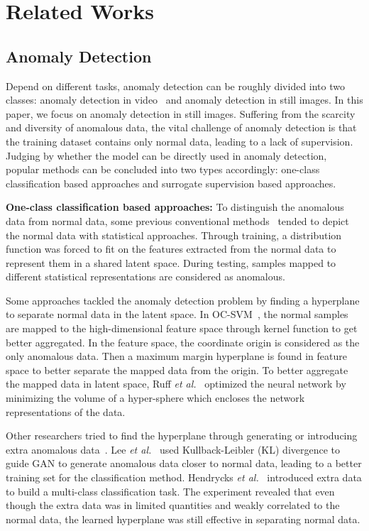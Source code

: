 \documentclass[journal]{IEEEtran}
\begin{document}
\section{Related Works}
\subsection{Anomaly Detection}
Depend on different tasks, anomaly detection can be roughly divided into two classes: anomaly detection in video~\cite{Kiran2018An, chu2018sparse, xu2018anomaly, xu2019video, sabokrou2016video, sabokrou2018avid, sabokrou2020deep, sabokrou2018deep, sabokrou2017deep, Sabokrou2018Adversarially} and anomaly detection in still images.
In this paper, we focus on anomaly detection in still images. Suffering from the scarcity and diversity of anomalous data, the vital challenge of anomaly detection is that the training dataset contains only normal data, leading to a lack of supervision. Judging by whether the model can be directly used in anomaly detection, popular methods can be concluded into two types accordingly: one-class classification based approaches and surrogate supervision based approaches. 

\noindent\textbf{One-class classification based approaches:}  To distinguish the anomalous data from normal data, some previous conventional methods~\cite{Eskin2000Anomaly, Yamanishi2000On, Rahmani2017Coherence, Xu2012Robust} tended to depict the normal data with statistical approaches. Through training, a distribution function was forced to fit on the features extracted from the normal data to represent them in a shared latent space. During testing, samples mapped to different statistical representations are considered as anomalous.

Some approaches tackled the anomaly detection problem by finding a hyperplane to separate normal data in the latent space.
In OC-SVM~\cite{scholkopf2001estimating}, the normal samples are mapped to the high-dimensional feature space through kernel function to get better aggregated. In the feature space, the coordinate origin is considered as the only anomalous data. Then a maximum margin hyperplane is found in feature space to better separate the mapped data from the origin.
To better aggregate the mapped data in latent space, Ruff \emph{et al.}~\cite{ruff2018deep} optimized the neural network by minimizing the volume of a hyper-sphere which encloses the network representations of the data.

Other researchers tried to find the hyperplane through generating or introducing extra anomalous data~\cite{lee2017training,hendrycks2018deep}. Lee \emph{et al.}~\cite{lee2017training} used Kullback-Leibler (KL) divergence to guide GAN to generate anomalous data closer to normal data, leading to a better training set for the classification method. 
Hendrycks \emph{et al.}~\cite{hendrycks2018deep} introduced extra data to build a multi-class classification task. The experiment revealed that even though the extra data was in limited quantities and weakly correlated to the normal data, the learned hyperplane was still effective in separating normal data.
\end{document}
